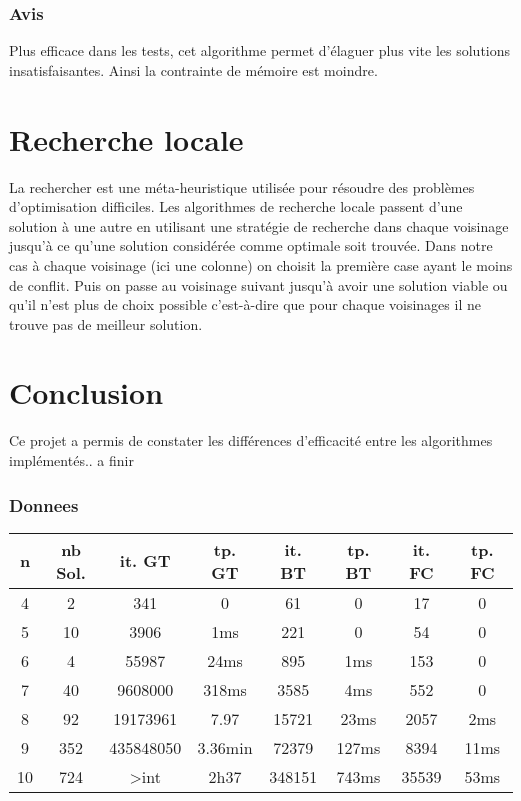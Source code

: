 \documentclass[a4paper,12pt]{report}
\begin{document}
	\subsubsection{Avis}
	Plus efficace dans les tests, cet algorithme permet d'élaguer plus vite les solutions insatisfaisantes. Ainsi la contrainte de mémoire est moindre.
	
	\section{Recherche locale}
	La rechercher est une méta-heuristique utilisée pour résoudre des problèmes d'optimisation difficiles.  Les algorithmes de recherche locale passent d'une solution à une autre en utilisant une stratégie de recherche dans chaque voisinage jusqu'à ce qu'une solution considérée comme optimale soit trouvée. Dans notre cas à chaque voisinage (ici une colonne) on choisit la première case ayant le moins de conflit. Puis on passe au voisinage suivant jusqu'à avoir une solution viable ou qu'il n'est plus de choix possible c'est-à-dire que pour chaque voisinages il ne trouve pas de meilleur solution.
 
	\newpage	
	\section*{Conclusion}
	Ce projet a permis de constater les différences d'efficacité entre les algorithmes implémentés.. a finir
	
	\subsubsection{Donnees}
			\begin{tabular}{|c|c|c|c|c|c|c|c|}
				\hline
				n & nb Sol. & it. GT & tp. GT & it. BT & tp. BT & it. FC & tp. FC  \\
				\hline
				4 & 2 & 341 & 0 & 61 & 0 & 17 & 0\\
				\hline
				5 & 10 & 3906 & 1ms & 221 & 0 & 54 & 0\\
				\hline
				6 & 4 & 55987 & 24ms & 895 & 1ms & 153 & 0\\
				\hline
				7 & 40 & 9608000 & 318ms & 3585 & 4ms & 552 & 0\\
				\hline
				8 & 92 & 19173961 & 7.97 & 15721 & 23ms & 2057 & 2ms\\
				\hline
				9 & 352 & 435848050 & 3.36min & 72379 & 127ms & 8394 & 11ms\\
				\hline
				10 & 724 & >int & 2h37 & 348151 & 743ms & 35539 & 53ms\\
				\hline
				
			\end{tabular}
\end{document}
